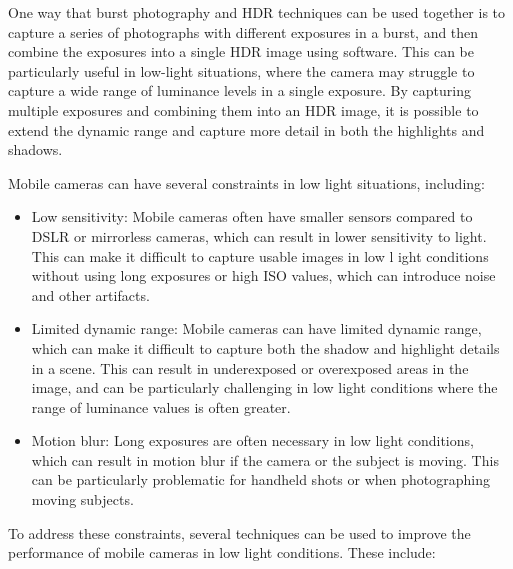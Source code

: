 \documentclass{egpubl}
\begin{document}
One way that burst photography and HDR techniques can be used together
is to capture a series of photographs with different exposures in a burst, and then combine 
the exposures into a single HDR image using software. This can be particularly useful in 
low-light situations, where the camera may struggle to capture a wide range of luminance 
levels in a single exposure. By capturing multiple exposures and combining them into an 
HDR image, it is possible to extend the dynamic range and capture more detail in both the 
highlights and shadows.

Mobile cameras can have several constraints in low light situations, including:

\begin{itemize}
    \item Low sensitivity: Mobile cameras often have smaller sensors compared 
          to DSLR or mirrorless cameras, which can result in lower sensitivity 
          to light. This can make it difficult to capture usable images in low l
          ight conditions without using long exposures or high ISO values, 
          which can introduce noise and other artifacts.
    
    \item Limited dynamic range: Mobile cameras can have limited dynamic range, 
          which can make it difficult to capture both the shadow and highlight 
          details in a scene. This can result in underexposed or overexposed 
          areas in the image, and can be particularly challenging in low light 
          conditions where the range of luminance values is often greater.
    
    \item Motion blur: Long exposures are often necessary in low light conditions, 
          which can result in motion blur if the camera or the subject is moving. 
          This can be particularly problematic for handheld shots or when photographing 
          moving subjects.
\end{itemize}

To address these constraints, several techniques can be used to improve the performance 
of mobile cameras in low light conditions. These include:
\end{document}
